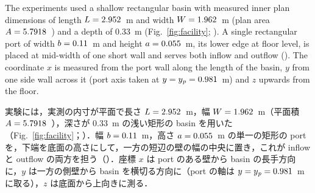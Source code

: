 
\label{sec:facility}

\begin{en}[M1-1]
The experiments used a shallow rectangular basin with measured inner plan dimensions of length $L = 2.952$~m and width $W = 1.962$~m (plan area $A = 5.7918$~\sqm{}) and a depth of 0.33~m (Fig.~\ref{fig:facility}; ). A single rectangular port of width $b = 0.11$~m and height $a = 0.055$~m, its lower edge at floor level, is placed at mid-width of one short wall and serves both inflow and outflow (). The coordinate $x$ is measured from the port wall along the length of the basin, $y$ from one side wall across it (port axis taken at $y = y_{\mathit{p}} = 0.981$~m) and $z$ upwards from the floor.
\end{en}
\begin{ja}
実験には，実測の内寸が平面で長さ $L = 2.952$~m，幅 $W = 1.962$~m（平面積 $A = 5.7918$~\sqm{}），深さが 0.33~m の浅い矩形の basin を用いた（Fig.~\ref{fig:facility}；）．幅 $b = 0.11$~m，高さ $a = 0.055$~m の単一の矩形の port を，下端を底面の高さにして，一方の短辺の壁の幅の中央に置き，これが inflow と outflow の両方を担う（）．座標 $x$ は port のある壁から basin の長手方向に，$y$ は一方の側壁から basin を横切る方向に（port の軸は $y = y_{\mathit{p}} = 0.981$~m に取る），$z$ は底面から上向きに測る．
\end{ja}


